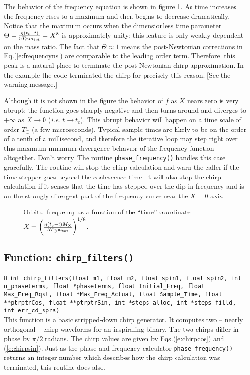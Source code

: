 The behavior of the frequency equation is shown in figure
\ref{f:pNcutoff}.  As time increases the frequency rises to a maximum
and then begins to decrease dramatically.  Notice that the maximum
occurs when the dimensionless time parameter $\Theta={\eta(t_c-t) \over
5 T_\odot m_{\rm tot} } = X^8$ is approximately  unity; this feature is
only weakly dependent on the mass ratio.  The fact that $\Theta \approx
1$ means the post-Newtonian corrections in Eq.(\ref{e:frequencyns}) are
comparable to the leading order term.  Therefore, this peak is a
natural place to terminate the post-Newtonian chirp approximation.  In
the example the code terminated the chirp for precisely this reason.
[See the warning message.]

Although it is not shown in the figure the behavior of $f$ as $X$ nears
zero is very abrupt; the function goes sharply negative and then turns
around and diverges to $+\infty$ as $X\rightarrow 0$ ({\it i.e.}
$t\rightarrow t_c$).  This abrupt behavior will happen on a time scale
of order $T_\odot$ (a few microseconds).  Typical sample times are
likely to be on the order of a tenth of a millisecond, and therefore
the iterative loop may step right over this maximum-minimum-divergence
behavior of the frequency function altogether.  Don't worry.  The
routine {\tt phase\_frequency()} handles this case gracefully.  The
routine will stop the chirp calculation and warn the caller if the time
stepper goes beyond the coalescence time.  It will also stop the chirp
calculation if it senses that the time has stepped over the dip in
frequency and is on the strongly divergent part of the frequency curve
near the $X=0$ axis.

\begin{figure}[h]
\begin{center}
\caption{ \label{f:pNcutoff}
Orbital frequency as a function of the ``time'' coordinate
$X=\biggl ( {\eta (t_c-t) M_\odot \over 5 T_\odot m_{\rm tot} } \biggr )^{1/8}$. }
\end{center}
\end{figure}

\clearpage

\subsection{Function: {\tt chirp\_filters()}}
\label{ss:chirp_filters}
\setcounter{equation}0
{\tt int chirp\_filters(float m1, float m2, float spin1, float spin2, int n\_phaseterms,
   float *phaseterms, float Initial\_Freq, float Max\_Freq\_Rqst, float
   *Max\_Freq\_Actual, float Sample\_Time, float **ptrptrCos, float
   **ptrptrSin, int *steps\_alloc, int *steps\_filld, int
   err\_cd\_sprs)
}\\
This function is a basic stripped-down chirp generator.  It computes
two -- nearly orthogonal --  chirp waveforms for an inspiraling
binary.  The two chirps differ in phase by $\pi/2$ radians.  The chirp
values are given by Eqs.(\ref{e:chirpcos}) and (\ref{e:chirpsin}).
Just as the phase and frequency calculator {\tt phase\_frequency()}
returns an integer number which describes how the chirp calculation
was terminated, this routine does also.

